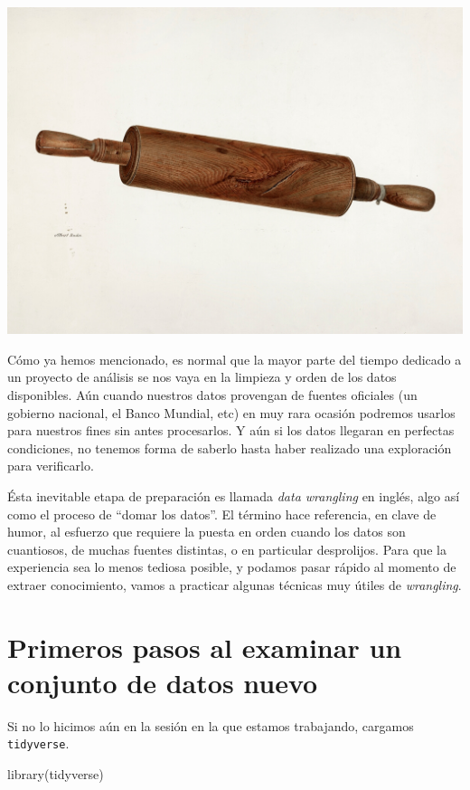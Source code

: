 \documentclass[
]{book}
\newenvironment{Shaded}{\begin{snugshade}}{\end{snugshade}}
\newcommand{\FunctionTok}[1]{\textcolor[rgb]{0.00,0.00,0.00}{#1}}
\newcommand{\NormalTok}[1]{#1}
\begin{document}
\includegraphics[width=1\linewidth]{imagenes/amasando}

Cómo ya hemos mencionado, es normal que la mayor parte del tiempo dedicado a un proyecto de análisis se nos vaya en la limpieza y orden de los datos disponibles. Aún cuando nuestros datos provengan de fuentes oficiales (un gobierno nacional, el Banco Mundial, etc) en muy rara ocasión podremos usarlos para nuestros fines sin antes procesarlos. Y aún si los datos llegaran en perfectas condiciones, no tenemos forma de saberlo hasta haber realizado una exploración para verificarlo.

Ésta inevitable etapa de preparación es llamada \emph{data wrangling} en inglés, algo así como el proceso de ``domar los datos''. El término hace referencia, en clave de humor, al esfuerzo que requiere la puesta en orden cuando los datos son cuantiosos, de muchas fuentes distintas, o en particular desprolijos. Para que la experiencia sea lo menos tediosa posible, y podamos pasar rápido al momento de extraer conocimiento, vamos a practicar algunas técnicas muy útiles de \emph{wrangling}.

\hypertarget{primeros-pasos-al-examinar-un-conjunto-de-datos-nuevo}{%
\section{Primeros pasos al examinar un conjunto de datos nuevo}\label{primeros-pasos-al-examinar-un-conjunto-de-datos-nuevo}}

Si no lo hicimos aún en la sesión en la que estamos trabajando, cargamos \texttt{tidyverse}.

\begin{Shaded}
\begin{Highlighting}[]
\FunctionTok{library}\NormalTok{(tidyverse)}
\end{Highlighting}
\end{Shaded}
\end{document}
